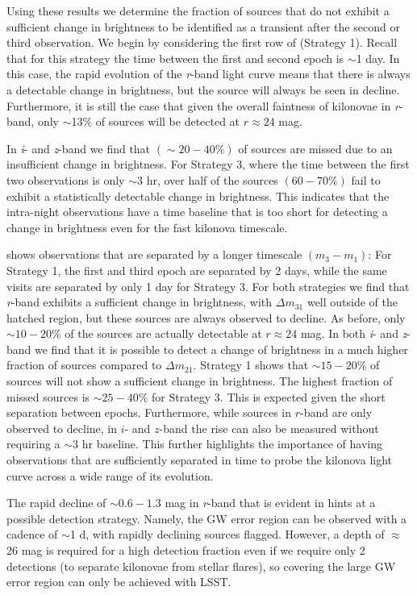 Using these results we determine the fraction of sources that do not exhibit a sufficient change in brightness to be identified as a transient after the second or third observation. We begin by considering the first row of  (Strategy 1). Recall that for this strategy the time between the first and second epoch is $\sim$1 day. In this case, the rapid evolution of the {\em r}-band light curve means that there is always a detectable change in brightness, but the source will always be seen in decline. Furthermore, it is still the case that given the overall faintness of kilonovae in {\em r}-band, only $\sim$13\% of sources will be detected at $r\approx24$ mag.

In {\em i}- and {\em z}-band we find that $(\sim 20-40\%)$ of sources are missed due to an insufficient change in brightness. For Strategy 3, where the time between the first two observations is only $\sim$3 hr, over half of the sources $(60-70\%)$ fail to exhibit a statistically detectable change in brightness. This indicates that the intra-night observations have a time baseline that is too short for detecting a change in brightness even for the fast kilonova timescale.

 shows observations that are separated by a longer timescale $(m_3 - m_1)$: For Strategy 1, the first and third epoch are separated by 2 days, while the same visits are separated by only 1 day for Strategy 3. For both strategies we find that {\em r}-band exhibits a sufficient change in brightness, with $\Delta m_{31}$ well outside of the hatched region, but these sources are always observed to decline. As before, only $\sim10-20$\% of the sources are actually detectable at $r\approx24$ mag. In both {\em i}- and {\em z}-band we find that it is possible to detect a change of brightness in a much higher fraction of sources compared to $\Delta m_{21}$. Strategy 1 shows that $\sim 15-20\%$ of sources will not show a sufficient change in brightness. The highest fraction of missed sources is $\sim 25-40\%$ for Strategy 3. This is expected given the short separation between epochs. Furthermore, while sources in $r$-band are only observed to decline, in $i$- and $z$-band the rise can also be measured without requiring a $\sim$3 hr baseline. This further highlights the importance of having observations that are sufficiently separated in time to probe the kilonova light curve across a wide range of its evolution.

The rapid decline of $\sim0.6-1.3$ mag in {\em r}-band that is evident in  hints at a possible detection strategy. Namely, the GW error region can be observed with a cadence of $\sim$1 d, with rapidly declining sources flagged. However, a depth of $\approx$26 mag is required for a high detection fraction even if we require only 2 detections (to separate kilonovae from stellar flares), so covering the large GW error region can only be achieved with LSST.

